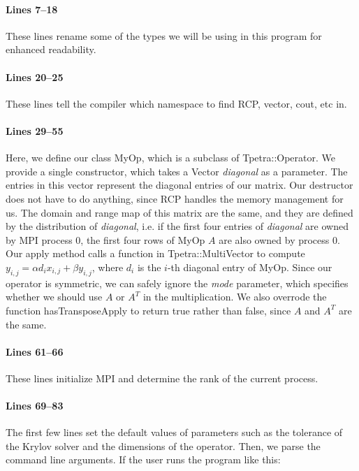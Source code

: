 \documentclass[pdf,12pt,report,strict]{SANDreport}
\begin{document}
\paragraph{Lines 7--18}
These lines rename some of the types we will be using in this program for
enhanced readability.

\paragraph{Lines 20--25}
These lines tell the compiler which namespace to find RCP, vector, cout, etc in.

\paragraph{Lines 29--55}
Here, we define our class MyOp, which is a subclass of Tpetra::Operator.  We
provide a single constructor, which takes a Vector \emph{diagonal} as a
parameter.  The entries in this vector represent the diagonal entries of our
matrix.  Our destructor does not have to do anything, since RCP handles the 
memory management for us.  The domain and range map of this matrix are the 
same, and they are defined by the distribution of \emph{diagonal}, i.e. if the
first four entries of \emph{diagonal} are owned by MPI process 0, the first
four rows of MyOp $A$ are also owned by process 0.  Our apply method calls a
function in Tpetra::MultiVector to compute $y_{i,j}=\alpha d_i x_{i,j}+\beta
y_{i,j}$, where $d_i$ is the $i$-th diagonal entry of MyOp.  Since our operator
is symmetric, we can safely ignore the \emph{mode} parameter, which specifies
whether we should use $A$ or $A^T$ in the multiplication.  We also overrode the
function hasTransposeApply to return true rather than false, since $A$ and $A^T$
are the same.

\paragraph{Lines 61--66}
These lines initialize MPI and determine the rank of the current process.

\paragraph{Lines 69--83}
The first few lines set the default values of parameters such as the tolerance
of the Krylov solver and the dimensions of the operator.  Then, we parse the
command line arguments.  If the user runs the program like this:
\end{document}
